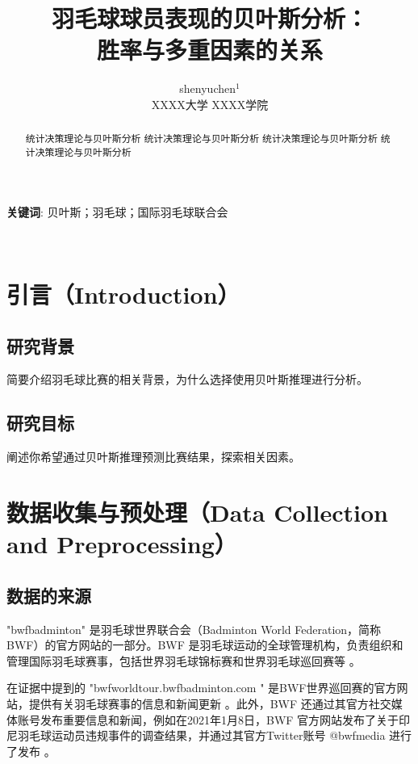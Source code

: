 \documentclass[12pt]{article}
\begin{document}
\title{羽毛球球员表现的贝叶斯分析：\\ 胜率与多重因素的关系}		%
\date{}

\author{shenyuchen$^1$		\\		XXXX大学 XXXX学院}		%
\maketitle

\begin{abstract}
统计决策理论与贝叶斯分析
统计决策理论与贝叶斯分析
统计决策理论与贝叶斯分析
统计决策理论与贝叶斯分析
\end{abstract}

\textbf{关键词}: 贝叶斯；羽毛球；国际羽毛球联合会

\			%

\section{引言（Introduction）}

\subsection{研究背景}
简要介绍羽毛球比赛的相关背景，为什么选择使用贝叶斯推理进行分析。

\subsection{研究目标}
阐述你希望通过贝叶斯推理预测比赛结果，探索相关因素。





\section{数据收集与预处理（Data Collection and Preprocessing）}
\subsection{数据的来源}
"bwfbadminton" 是羽毛球世界联合会（Badminton World Federation，简称BWF）的官方网站的一部分。BWF 是羽毛球运动的全球管理机构，负责组织和管理国际羽毛球赛事，包括世界羽毛球锦标赛和世界羽毛球巡回赛等
。

在证据中提到的 "bwfworldtour.bwfbadminton.com " 是BWF世界巡回赛的官方网站，提供有关羽毛球赛事的信息和新闻更新
。此外，BWF 还通过其官方社交媒体账号发布重要信息和新闻，例如在2021年1月8日，BWF 官方网站发布了关于印尼羽毛球运动员违规事件的调查结果，并通过其官方Twitter账号 @bwfmedia 进行了发布
。
\end{document}

